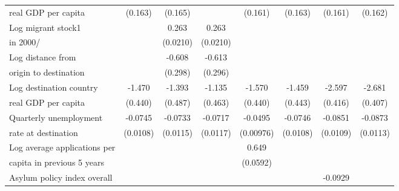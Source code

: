 \begin{table}[htbp]
\begin{tabular}{l*{7}{c}}
real GDP per capita                    &     (0.163)         &     (0.165)         &                     &     (0.161)         &     (0.163)         &     (0.161)         &     (0.162)         \\
[0,5em]
Log migrant stock1&                     &       0.263\sym{***}&       0.263\sym{***}&                     &                     &                     &                     \\
 in 2000/                    &                     &    (0.0210)         &    (0.0210)         &                     &                     &                     &                     \\
[0,5em]
Log distance from &                     &      -0.608\sym{*}  &      -0.613\sym{*}  &                     &                     &                     &                     \\
origin to destination                    &                     &     (0.298)         &     (0.296)         &                     &                     &                     &                     \\
[0,5em]
Log destination country&      -1.470\sym{**} &      -1.393\sym{**} &      -1.135\sym{*}  &      -1.570\sym{***}&      -1.459\sym{**} &      -2.597\sym{***}&      -2.681\sym{***}\\
real GDP per capita                    &     (0.440)         &     (0.487)         &     (0.463)         &     (0.440)         &     (0.443)         &     (0.416)         &     (0.407)         \\
[0,5em]
Quarterly unemployment&     -0.0745\sym{***}&     -0.0733\sym{***}&     -0.0717\sym{***}&     -0.0495\sym{***}&     -0.0746\sym{***}&     -0.0851\sym{***}&     -0.0873\sym{***}\\
rate at destination                    &    (0.0108)         &    (0.0115)         &    (0.0117)         &   (0.00976)         &    (0.0108)         &    (0.0109)         &    (0.0113)         \\
[0,5em]
Log average applications per &                     &                     &                     &       0.649\sym{***}&                     &                     &                     \\
capita in previous 5 years                    &                     &                     &                     &    (0.0592)         &                     &                     &                     \\
[0,5em]
Asylum policy index overall&                     &                     &                     &                     &                     &     -0.0929\sym{***}&                     \\

\end{tabular}
\end{table}

